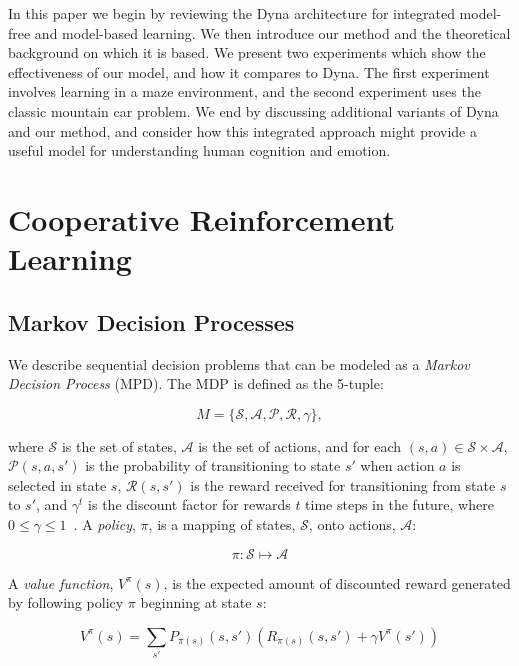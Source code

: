 \documentclass[letterpaper]{article}
\begin{document}
In this paper we begin by reviewing the Dyna architecture for integrated model-free and model-based learning. We then introduce our method and the theoretical background on which it is based. We present two experiments which show the effectiveness of our model, and how it compares to Dyna. The first experiment involves learning in a maze environment, and the second experiment uses the classic mountain car problem. We end by discussing additional variants of Dyna and our method, and consider how this integrated approach might provide a useful model for understanding human cognition and emotion.

\section{Cooperative Reinforcement Learning}

\subsection{Markov Decision Processes}

We describe sequential decision problems that can be modeled as a \textit{Markov Decision Process} (MPD). The MDP is defined as the 5-tuple:

\begin{equation}
M=\{\mathcal{S},\mathcal{A},\mathcal{P},\mathcal{R},\gamma\},
\end{equation} 

\noindent
where $\mathcal{S}$ is the set of states, $\mathcal{A}$ is the set of actions, and for each $(s,a) \in \mathcal{S} \times \mathcal{A}$, $\mathcal{P}(s,a,s')$ is the probability of transitioning to state $s'$ when action $a$ is selected in state $s$, $\mathcal{R}(s,s')$ is the reward received for transitioning from state $s$ to $s'$, and $\gamma^t$ is the discount factor for rewards $t$ time steps in the future, where $0\leq\gamma\leq1$~\cite{sutton1998reinforcement}. A \textit{policy}, $\pi$, is a mapping of states, $\mathcal{S}$, onto actions, $\mathcal{A}$:

\begin{equation}
\pi:\mathcal{S}\mapsto\mathcal{A}
\end{equation} 

\noindent
A \textit{value function}, $V^{\pi}(s)$, is the expected amount of discounted reward generated by following policy $\pi$ beginning at state $s$:

\begin{equation} 
V^{\pi}(s) = \sum\limits_{s'} P_{\pi(s)}(s,s')(R_{\pi(s)}(s,s')+\gamma V^{\pi}(s'))
\end{equation}
\end{document}
